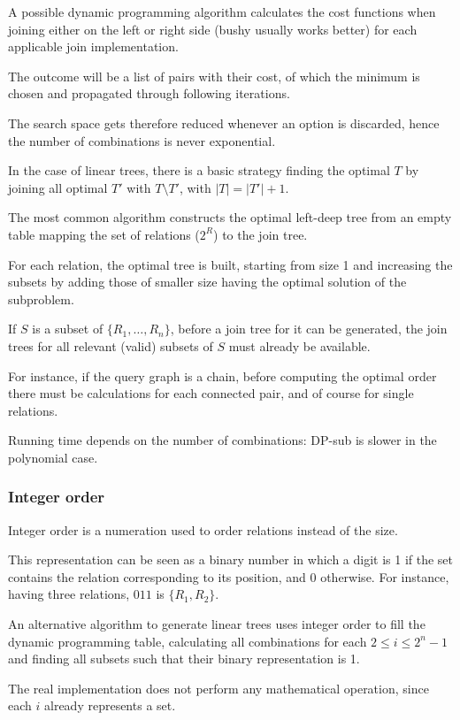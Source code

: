 A possible dynamic programming algorithm calculates the cost functions when joining either on the left or right side (bushy usually works better) for each applicable join implementation. 

The outcome will be a list of pairs with their cost, of which the minimum is chosen and propagated through following iterations.

The search space gets therefore reduced whenever an option is discarded, hence the number of combinations is never exponential.

In the case of linear trees, there is a basic strategy finding the optimal $T$ by joining all optimal $T'$ with $T \setminus T'$, with $|T| = |T'| + 1$.

The most common algorithm constructs the optimal left-deep tree from an empty table mapping the set of relations ($2^R$) to the join tree. 

For each relation, the optimal tree is built, starting from size 1 and increasing the subsets by adding those of smaller size having the optimal solution of the subproblem.

If $S$ is a subset of $\{R_1, \dots, R_n\}$, before a join tree for it can be generated, the join trees for all relevant (valid) subsets of $S$ must already be available.

For instance, if the query graph is a chain, before computing the optimal order there must be calculations for each connected pair, and of course for single relations.

Running time depends on the number of combinations: DP-sub is slower in the polynomial case.

\subsubsection{Integer order}
Integer order is a numeration used to order relations instead of the size.

This representation can be seen as a binary number in which a digit is 1 if the set contains the relation corresponding to its position, and 0 otherwise. For instance, having three relations, $011$ is $\{R_1, R_2\}$.

An alternative algorithm to generate linear trees uses integer order to fill the dynamic programming table, calculating all combinations for each $2 \leq i \leq 2^n-1$ and finding all subsets such that their binary representation is 1.

The real implementation does not perform any mathematical operation, since each $i$ already represents a set. 

